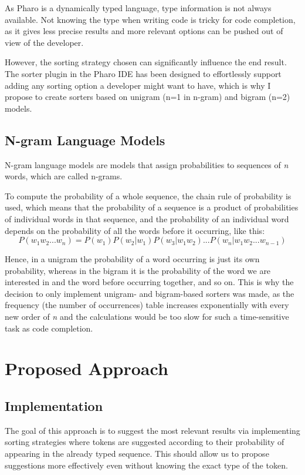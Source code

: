 \documentclass[sigconf,screen]{acmart}
\begin{document}
As Pharo is a dynamically typed language, type information is not always available. Not knowing the type when writing code is tricky for code completion, as it gives less precise results and more relevant options can be pushed out of view of the developer.

However, the sorting strategy chosen can significantly influence the end result. The sorter plugin in the Pharo IDE has been designed to effortlessly support adding any sorting option a developer might want to have, which is why I propose to create sorters based on unigram (n=1 in n-gram) and bigram (n=2) models.

\subsection{N-gram Language Models}
N-gram language models are models that assign probabilities to sequences of \textit{n} words, which are called n-grams.

To compute the probability of a whole sequence, the chain rule of probability is used, which means that the probability of a sequence is a product of probabilities of individual words in that sequence, and the probability of an individual word depends on the probability of all the words before it occurring, like this:
\begin{equation}
    P(w_1w_2...w_n) = P(w_1)P(w_2|w_1)P(w_3|w_1w_2)...P(w_n|w_1w_2...w_{n-1})
\end{equation}

Hence, in a unigram the probability of a word occurring is just its own probability, whereas in the bigram it is the probability of the word we are interested in and the word before occurring together, and so on. This is why the decision to only implement unigram- and bigram-based sorters was made, as the frequency (the number of occurrences) table increases exponentially with every new order of \textit{n} and the calculations would be too slow for such a time-sensitive task as code completion.

\section{Proposed Approach}
\subsection{Implementation}
The goal of this approach is to suggest the most relevant results via implementing sorting strategies where tokens are suggested according to their probability of appearing in the already typed sequence. This should allow us to propose suggestions more effectively even without knowing the exact type of the token.
\end{document}
